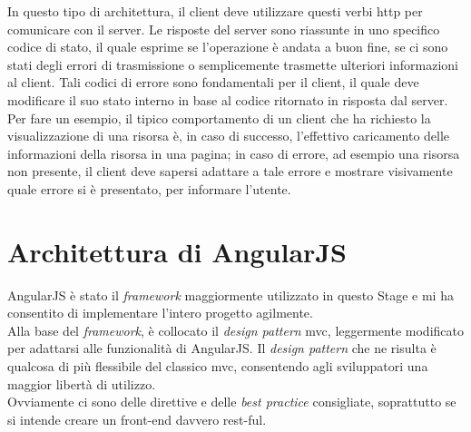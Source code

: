 In questo tipo di architettura, il client deve utilizzare questi verbi \gls{http} per comunicare con il server. Le risposte del server sono riassunte in uno specifico codice di stato, il quale esprime se l'operazione è andata a buon fine, se ci sono stati degli errori di trasmissione o semplicemente trasmette ulteriori informazioni al client. Tali codici di errore sono fondamentali per il client, il quale deve modificare il suo stato interno in base al codice ritornato in risposta dal server. Per fare un esempio, il tipico comportamento di un client che ha richiesto la visualizzazione di una risorsa è, in caso di successo, l'effettivo caricamento delle informazioni della risorsa in una pagina; in caso di errore, ad esempio una risorsa non presente, il client deve sapersi adattare a tale errore e mostrare visivamente quale errore si è presentato, per informare l'utente.


\section{Architettura di AngularJS}
AngularJS è stato il \emph{framework} maggiormente utilizzato in questo Stage e mi ha consentito di implementare l'intero progetto agilmente.\\
Alla base del \emph{framework}, è collocato il \emph{design pattern} \gls{mvc}, leggermente modificato per adattarsi alle funzionalità di AngularJS. Il \emph{design pattern} che ne risulta è qualcosa di più flessibile del classico \gls{mvc}, consentendo agli sviluppatori una maggior libertà di utilizzo.\\
Ovviamente ci sono delle direttive e delle \emph{best practice} consigliate, soprattutto se si intende creare un \gls{front-end} davvero \gls{rest}-ful.

